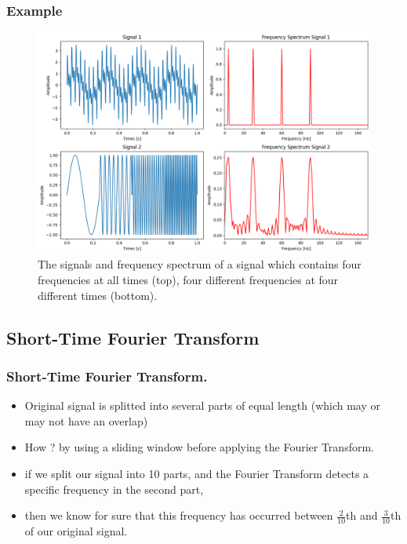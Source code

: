 \documentclass{beamer}
\begin{document}
\begin{frame}
	\frametitle{Example}
	\begin{center}
		\begin{figure}
			\includegraphics[scale=0.25]{fft_spectra-1.png}
			\caption{ The signals and frequency spectrum of a signal which contains four frequencies at all times (top), four different frequencies at four different times (bottom).}	
		\end{figure}
	\end{center}
	
	
\end{frame}


\subsection{Short-Time Fourier Transform}
\begin{frame}
	\frametitle{Short-Time Fourier Transform.}
	
	\begin{itemize}
		\item
		Original signal is splitted into several parts of equal length (which may or may not have an overlap)
		
		\item
		How  ? by using a sliding window before applying the Fourier Transform.
		
		\item
		
		if we split our signal into 10 parts, and the Fourier Transform detects a specific frequency in the second part,
		
		\item
		
		then we know for sure that this frequency has occurred between $\frac{2}{10}$th and $\frac{3}{10}$th of our original signal.
		
		
	\end{itemize}
\end{frame}
\end{document}
